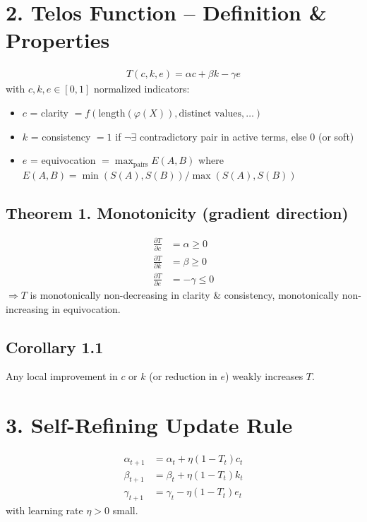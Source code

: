 \documentclass[11pt]{article}
\begin{document}
\section*{2. Telos Function -- Definition \& Properties}
\begin{align*}
    T(c,k,e) = \alpha c + \beta k - \gamma e
\end{align*}
with $c,k,e \in [0,1]$ normalized indicators:
\begin{itemize}
    \item $c$ = clarity $= f(\text{length}(\varphi(X)), \text{distinct values}, \ldots)$
    \item $k$ = consistency $= 1$ if $\neg\exists$ contradictory pair in active terms, else $0$ (or soft)
    \item $e$ = equivocation $= \max_{\text{pairs}} E(A,B)$ where $E(A,B) = \min(S(A),S(B))/\max(S(A),S(B))$
\end{itemize}

\subsection*{Theorem 1. Monotonicity (gradient direction)}
\begin{align*}
    \frac{\partial T}{\partial c} &= \alpha \geq 0\\
    \frac{\partial T}{\partial k} &= \beta \geq 0\\
    \frac{\partial T}{\partial e} &= -\gamma \leq 0
\end{align*}
\noindent $\Rightarrow T$ is monotonically non-decreasing in clarity \& consistency, monotonically non-increasing in equivocation.

\subsection*{Corollary 1.1}
Any local improvement in $c$ or $k$ (or reduction in $e$) weakly increases $T$.

\section*{3. Self-Refining Update Rule}
\begin{align*}
    \alpha_{t+1} &= \alpha_t + \eta (1 - T_t) c_t\\
    \beta_{t+1} &= \beta_t + \eta (1 - T_t) k_t\\
    \gamma_{t+1} &= \gamma_t - \eta (1 - T_t) e_t
\end{align*}
with learning rate $\eta > 0$ small.
\end{document}
